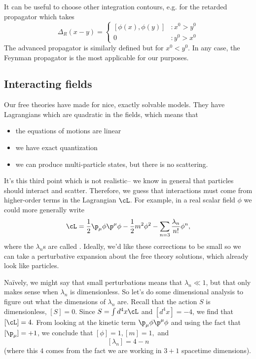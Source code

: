 It can be useful to choose other integration contours, e.g. for the retarded propagator which takes
$$\Delta_R(x-y)=\begin{cases}
[\phi(x),\phi(y)] &: x^0>y^0\\
0 &: y^0 > x^0
\end{cases}$$
The advanced propagator is similarly defined but for $x^0<y^0$. In any case, the Feynman propagator is the most applicable for our purposes.

\subsection*{Interacting fields} Our free theories have made for nice, exactly solvable models. They have Lagrangians which are quadratic in the fields, which means that
\begin{itemize}
    \item the equations of motions are linear
    \item we have exact quantization
    \item we can produce multi-particle states, but there is no scattering.
\end{itemize}

It's this third point which is not realistic-- we know in general that particles should interact and scatter. Therefore, we guess that interactions must come from higher-order terms in the Lagrangian $\cL$. For example, in a real scalar field $\phi$ we could more generally write
$$\cL=\frac{1}{2}\p_\mu \phi \p^\mu \phi -\frac{1}{2}m^2 \phi^2 - \sum_{n=3} \frac{\lambda_n}{n!} \phi^n,$$ where the $\lambda_n$s are called . Ideally, we'd like these corrections to be small so we can take a perturbative expansion about the free theory solutions, which already look like particles.

Na\"ively, we might say that small perturbations means that $\lambda_n \ll 1$, but that only makes sense when $\lambda_n$ is dimensionless. So let's do some dimensional analysis to figure out what the dimensions of $\lambda_n$ are. Recall that the action $S$ is dimensionless, $[S]=0.$
Since $S=\int d^4 x \cL$ and $[d^4x]=-4$, we find that $[\cL]=4.$ From looking at the kinetic term $\p_\mu \phi \p^\mu \phi$ and using the fact that $[\p_\mu]=+1$, we conclude that $[\phi]=1, [m]=1,$ and
$$[\lambda_n]=4-n$$ (where this $4$ comes from the fact we are working in $3+1$ spacetime dimensions).

